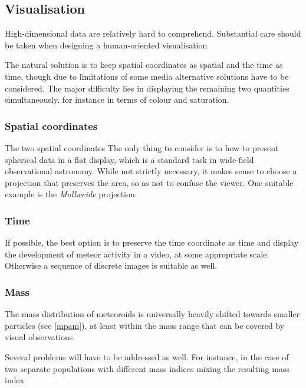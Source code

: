     \subsection{Visualisation} \label{iov}
        High-dimensional data are relatively hard to comprehend. Substantial care should be taken when designing
        a human-oriented visualisation


        The natural solution is to keep spatial coordinates as spatial and the time as time,
        though due to limitations of some media alternative solutions have to be considered.
        The major difficulty lies in displaying the remaining two quantities simultaneously.
        for instance in terms of colour and saturation.

        \subsubsection{Spatial coordinates} \label{iovs}
            The two spatial coordinates 
            The only thing to consider is to how to present spherical data in a flat display,
            which is a standard task in wide-field observational astronomy.
            While not strictly necessary, it makes sense to choose a projection
            that preserves the area, so as not to confuse the viewer.
            One suitable example is the \emph{Mollweide} projection.

        \subsubsection{Time} \label{iovt}
            If possible, the best option is to preserve the time coordinate as time
            and display the development of meteor activity in a video, at some appropriate scale.
            Otherwise a sequence of discrete images is suitable as well.

        \subsubsection{Mass} \label{iovm}
            The mass distribution of meteoroids is universally heavily shifted
            towards smaller particles (see \cref{mpam}), at least within the mass
            range that can be covered by visual observations.

            Several problems will have to be addressed as well. For instance, in the case
            of two separate populations with different mass indices mixing the resulting
            mass index 

